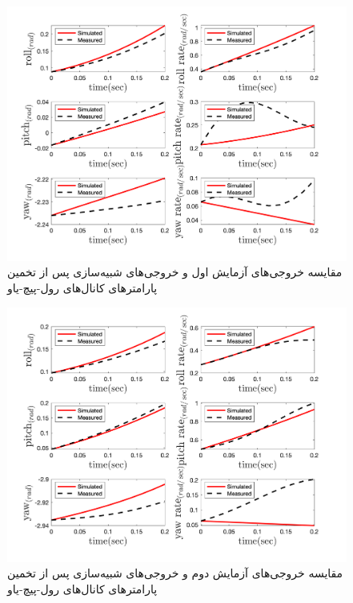 \begin{figure}[H]
	\includegraphics[width=12cm]{../../Figures/RCP/roll_pitch_yaw_parameter_estimation/RCP_roll_pitch_yaw_S1.png}
	\centering
	\caption{مقايسه خروجی‌های آزمايش اول و خروجی‌های شبیه‌سازی پس از تخمین پارامترهای کانال‌های رول-پیچ-یاو}
	\label{ roll_pitch_yaw_ps1}
\end{figure}
\begin{figure}[H]
	\includegraphics[width=12cm]{../../Figures/RCP/roll_pitch_yaw_parameter_estimation/RCP_roll_pitch_yaw_S2.png}
	\centering
	\caption{مقايسه خروجی‌های آزمايش دوم و خروجی‌های شبیه‌سازی پس از تخمین پارامترهای کانال‌های رول-پیچ-یاو}
	\label{ roll_pitch_yaw_ps2}
\end{figure}
